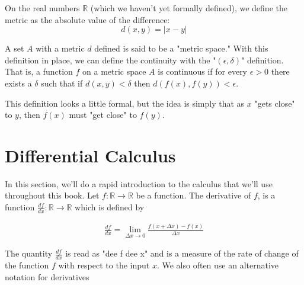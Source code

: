 \documentclass[book.tex]{subfiles}
\begin{document}
On the real numbers $\mathbb{R}$ (which we haven't yet formally defined), we define the metric as the absolute value of the difference:
\[ d(x, y) = |x - y| \]

A set $A$ with a metric $d$ defined is said to be a "metric space." With this definition in place, we can define the continuity with the "$(\epsilon, \delta)$" definition. That is, a function $f$ on a metric space $A$ is continuous if for every $\epsilon > 0$ there exists a $\delta$ such that if $d(x, y) < \delta$ then $d(f(x), f(y)) < \epsilon$.

This definition looks a little formal, but the idea is simply that as $x$ "gets close" to $y$, then $f(x)$ must "get close" to $f(y)$.


\section{Differential Calculus}

In this section, we'll do a rapid introduction to the calculus that we'll use throughout this book. Let $f: \mathbb{R} \to \mathbb{R}$ be a function. The derivative of $f$, is a function $\frac{df}{dx}: \mathbb{R} \to \mathbb{R}$ which is defined by

\begin{align}
\frac{df}{dx} = \lim_{\Delta x \to 0} \frac{f(x + \Delta x) - f(x)}{\Delta x}
\end{align}

The quantity $\frac{df}{dx}$ is read as "dee f dee x" and is a measure of the rate of change of the function $f$ with respect to the input $x$. We also often use an alternative notation for derivatives
\end{document}
